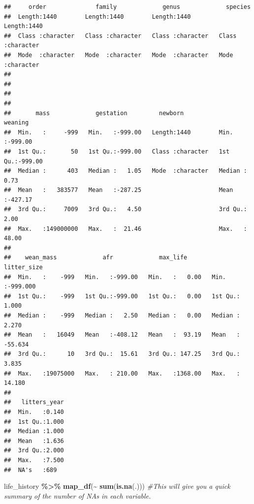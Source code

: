 \documentclass[
]{article}
\newenvironment{Shaded}{\begin{snugshade}}{\end{snugshade}}
\newcommand{\CommentTok}[1]{\textcolor[rgb]{0.56,0.35,0.01}{\textit{#1}}}
\newcommand{\FunctionTok}[1]{\textcolor[rgb]{0.13,0.29,0.53}{\textbf{#1}}}
\newcommand{\NormalTok}[1]{#1}
\newcommand{\SpecialCharTok}[1]{\textcolor[rgb]{0.81,0.36,0.00}{\textbf{#1}}}
\begin{document}
\begin{verbatim}
##     order              family             genus             species         
##  Length:1440        Length:1440        Length:1440        Length:1440       
##  Class :character   Class :character   Class :character   Class :character  
##  Mode  :character   Mode  :character   Mode  :character   Mode  :character  
##                                                                             
##                                                                             
##                                                                             
##                                                                             
##       mass             gestation         newborn             weaning       
##  Min.   :     -999   Min.   :-999.00   Length:1440        Min.   :-999.00  
##  1st Qu.:       50   1st Qu.:-999.00   Class :character   1st Qu.:-999.00  
##  Median :      403   Median :   1.05   Mode  :character   Median :   0.73  
##  Mean   :   383577   Mean   :-287.25                      Mean   :-427.17  
##  3rd Qu.:     7009   3rd Qu.:   4.50                      3rd Qu.:   2.00  
##  Max.   :149000000   Max.   :  21.46                      Max.   :  48.00  
##                                                                            
##    wean_mass             afr             max_life        litter_size      
##  Min.   :    -999   Min.   :-999.00   Min.   :   0.00   Min.   :-999.000  
##  1st Qu.:    -999   1st Qu.:-999.00   1st Qu.:   0.00   1st Qu.:   1.000  
##  Median :    -999   Median :   2.50   Median :   0.00   Median :   2.270  
##  Mean   :   16049   Mean   :-408.12   Mean   :  93.19   Mean   : -55.634  
##  3rd Qu.:      10   3rd Qu.:  15.61   3rd Qu.: 147.25   3rd Qu.:   3.835  
##  Max.   :19075000   Max.   : 210.00   Max.   :1368.00   Max.   :  14.180  
##                                                                           
##   litters_year  
##  Min.   :0.140  
##  1st Qu.:1.000  
##  Median :1.000  
##  Mean   :1.636  
##  3rd Qu.:2.000  
##  Max.   :7.500  
##  NA's   :689
\end{verbatim}

\begin{Shaded}
\begin{Highlighting}[]
\NormalTok{life\_history }\SpecialCharTok{\%\textgreater{}\%} \FunctionTok{map\_df}\NormalTok{(}\SpecialCharTok{\textasciitilde{}} \FunctionTok{sum}\NormalTok{(}\FunctionTok{is.na}\NormalTok{(.))) }\CommentTok{\#This will give you a quick summary of the number of NA\textquotesingle{}s in each variable.}
\end{Highlighting}
\end{Shaded}
\end{document}
